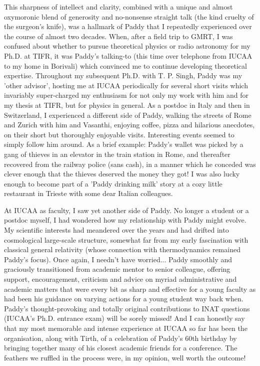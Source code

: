\documentclass[prd, preprint, longbibliography, 11pt]{revtex4-1}
\begin{document}
This sharpness of intellect and clarity, combined with a unique and almost oxymoronic blend of generosity and no-nonsense straight talk (the kind cruelty of the surgeon's knife), was a hallmark of Paddy that I repeatedly experienced over the course of almost two decades. When, after a field trip to GMRT, I was confused about whether to pursue theoretical physics or radio astronomy for my Ph.D. at TIFR, it was Paddy's talking-to (this time over telephone from IUCAA to my home in Borivali) which convinced me to continue developing theoretical expertise. Throughout my subsequent Ph.D. with T. P. Singh, Paddy was my 'other advisor', hosting me at IUCAA periodically for several short visits which invariably super-charged my enthusiasm for not only my work with him and for my thesis at TIFR, but for physics in general. As a postdoc in Italy and then in Switzerland, I experienced a different side of Paddy, walking the streets of Rome and Zurich with him and Vasanthi, enjoying coffee, pizza and hilarious anecdotes, on their short but thoroughly enjoyable visits. Interesting events seemed to simply follow him around. As a brief example: Paddy's wallet was picked by a gang of thieves in an elevator in the train station in Rome, and thereafter recovered from the railway police (sans cash), in a manner which he conceded was clever enough that the thieves deserved the money they got! I was also lucky enough to become part of a 'Paddy drinking milk' story at a cozy little restaurant in Trieste with some dear Italian colleagues.

At IUCAA as faculty, I saw yet another side of Paddy. No longer a student or a postdoc myself, I had wondered how my relationship with Paddy might evolve. My scientific interests had meandered over the years and had drifted into cosmological large-scale structure, somewhat far from my early fascination with classical general relativity (whose connection with thermodynamics remained Paddy's focus). Once again, I needn't have worried... Paddy smoothly and graciously transitioned from academic mentor to senior colleague, offering support, encouragement, criticism and advice on myriad administrative and academic matters that were every bit as sharp and effective for a young faculty as had been his guidance on varying actions for a young student way back when. Paddy's thought-provoking and totally original contributions to INAT questions (IUCAA's Ph.D. entrance exam) will be sorely missed! And I can honestly say that my most memorable and intense experience at IUCAA so far has been the organisation, along with Tirth, of a celebration of Paddy's 60th birthday by bringing together many of his closest academic friends for a conference. The feathers we ruffled in the process were, in my opinion, well worth the outcome! 
\end{document}
